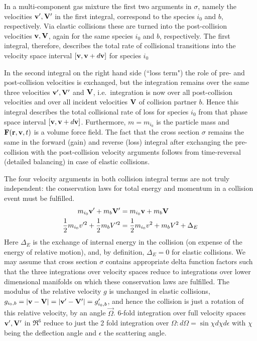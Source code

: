 In a multi-component gas mixture the first two arguments in $\sigma$, namely
the velocities $\mathbf{v}',\mathbf{V}'$ in the first integral, correspond to the species
$i_0$ and $b$, respectively.
Via elastic collisions these are turned into the post-collision velocities
$\mathbf{v}, \mathbf{V}$, again for the same species $i_0$ and $b$, respectively.
The first integral, therefore, describes the total rate of collisional
transitions into the velocity space interval $[\mathbf{v},\mathbf{v}+d\mathbf{v}]$ for species $i_0$

In the second integral on the right hand side (``loss term") the role of pre-
and post-collision velocities is exchanged, but the integration remains over
the same three velocities $\mathbf{v}',\mathbf{V}'$ and $\mathbf{V}$, i.e.\ integration is now over
all post-collision velocities and over all incident velocities $\mathbf{V}$ of
collision partner $b$.
Hence this integral describes the total collisional rate of loss for species
$i_0$ from that phase space interval $[\mathbf{v},\mathbf{v}+d\mathbf{v}]$.
Furthermore, $m = m_{i_0}$ is the particle mass and $\mathbf{F}(\mathbf{r},\mathbf{v},t)$ is a
volume force field.
The fact that the cross section $\sigma$ remains the same in the forward (gain)
and reverse (loss) integral after exchanging the pre-collision with the
post-collision velocity arguments follows from time-reversal (detailed
balancing) in case of elastic collisions.

The four velocity arguments in both collision integral terms are not truly
independent:
the conservation laws for total energy and
momentum in a collision event must be fulfilled.
\begin{align}
  \label{massenergy}
  m_{i_0} \mathbf{v}' + m_b\mathbf{V}'             & = m_{i_0}\mathbf{v} + m_b \mathbf{V} \nonumber
  \\
  \frac12 m_{i_0}v'^2+\frac12m_bV'^2 & =\frac12 m_{i_0}v^2 + m_b V^2 +\Delta_E
\end{align}
Here $\Delta_E$ is the exchange of internal energy in the collision (on expense
of the energy of relative motion), and, by definition, $\Delta_E = 0$ for
elastic collisions.
We may assume that cross section $\sigma$ contains appropriate delta function
factors such that the three integrations over velocity spaces reduce to
integrations over lower dimensional manifolds on which these conservation laws
are fulfilled.
The modulus of the relative velocity $g$ is unchanged in elastic collisions,
$g_{i_0,b} = |\mathbf{v}-\mathbf{V}| = |\mathbf{v}'-\mathbf{V}'| = g_{i_0,b}'$, and hence the collision is
just a rotation of this relative velocity, by an angle $\vec\Omega$.
6-fold integration over full velocity spaces $\mathbf{v}', \mathbf{V}'$ in $\Re^6$ reduce to
just the 2 fold integration over $\Omega:  d\Omega=\sin\chi d\chi d\epsilon$
with $\chi$ being the deflection angle and $\epsilon$ the scattering angle.

